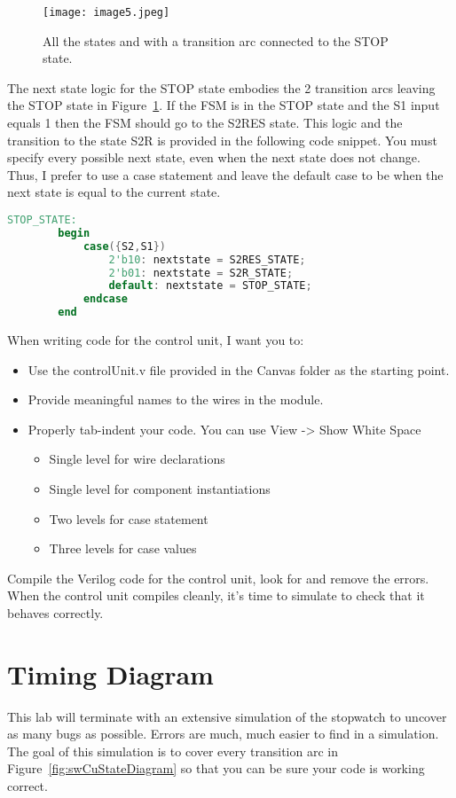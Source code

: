 \begin{figure}[ht]
\texttt{[image: image5.jpeg]}
\caption{All the states and with a transition arc connected to the STOP state.}
\label{fig:swCuStopState}
\end{figure}


The next state logic for the STOP state embodies the 2 transition arcs
leaving the STOP state in Figure~\ref{fig:swCuStopState}. If the FSM is in the STOP state and
the S1 input equals 1 then the FSM should go to the S2RES state. This
logic and the transition to the state S2R is provided in the following
code snippet. You must specify every possible next state, even when the
next state does not change. Thus, I prefer to use a case statement and
leave the default case to be when the next state is equal to the current
state.

\begin{lstlisting}[language=Verilog,  frame=single]
	STOP_STATE:
		begin
			case({S2,S1})
				2'b10: nextstate = S2RES_STATE;
				2'b01: nextstate = S2R_STATE;
				default: nextstate = STOP_STATE;
			endcase
		end
\end{lstlisting}

When writing code for the control unit, I want you to:

\begin{itemize}
\item
  Use the controlUnit.v file provided in the Canvas folder as the
  starting point.
\item
  Provide meaningful names to the wires in the module.
\item
  Properly tab-indent your code. You can use View -\textgreater{} Show
  White Space

  \begin{itemize}
  \item
    Single level for wire declarations
  \item
    Single level for component instantiations
  \item
    Two levels for case statement
  \item
    Three levels for case values
  \end{itemize}
\end{itemize}

Compile the Verilog code for the control unit, look for and remove the
errors. When the control unit compiles cleanly, it's time to simulate to
check that it behaves correctly.

\section{Timing Diagram}
This lab will terminate with an extensive simulation of the stopwatch to 
uncover as many bugs as
possible. Errors are much, much easier to find in a
simulation. The goal of this simulation is to cover every transition arc
in Figure~\ref{fig:swCuStateDiagram} so that you can be sure your code is working correct.

